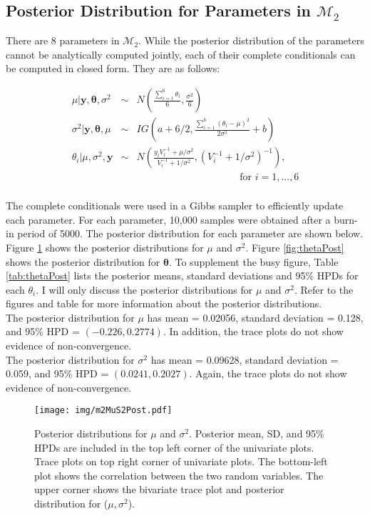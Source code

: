 \documentclass{../../tex_template/asaproc}
\newcommand{\p}[1]{\left(#1\right)}
\newcommand{\ds}{ \displaystyle }
\newcommand{\M}{\mathcal{M}}
\newcommand{\sumk}{\sum_{i=1}^6}
\begin{document}
\subsection{Posterior Distribution for Parameters in $\M_2$}
There are 8 parameters in $\M_2$. While the posterior distribution of the
parameters cannot be analytically computed jointly, each of their complete
conditionals can be computed in closed form. They are as follows:

\newcommand{\ivy}{\sumk V_i^{-1}}
$$
\begin{array}{rcl}
  \mu | \bm y,\bm\theta,\sigma^2  &\sim& 
  N\p{\ds\frac{\sumk \theta_i}{6},\ds\frac{\sigma^2}{6}}\\
  \sigma^2 | \bm y,\bm\theta , \mu &\sim& 
  IG\p{a+6/2,\ds\frac{\sumk(\theta_i-\mu)^2}{2\sigma^2}+b}\\
  \theta_i | \mu, \sigma^2, \bm y &\sim& 
  N\p{\ds\frac{y_iV_i^{-1}+\mu/\sigma^2}{V_i^{-1}+1/\sigma^2},\p{V_i^{-1}+1/\sigma^2}^{-1}},\\
  &&\hspace{10em} \text{~for~} i=1,...,6\\
\end{array}
$$

The complete conditionals were used in a Gibbs sampler to efficiently update
each parameter. For each parameter, 10,000 samples were obtained after a
burn-in period of 5000.  The posterior distribution for each parameter are
shown below. Figure \ref{fig:m2MuS2Post} shows the posterior distributions for
$\mu$ and $\sigma^2$. Figure \ref{fig:thetaPost} shows the posterior
distribution for $\bm\theta$. To supplement the busy figure, Table
\ref{tab:thetaPost} lists the posterior means, standard deviations and 95\%
HPDs for each $\theta_i$. I will only discuss the posterior distributions for
$\mu$ and $\sigma^2$. Refer to the figures and table for more information about
the posterior distributions.\\

The posterior distribution for $\mu$ has mean = 0.02056, standard deviation
= 0.128, and 95\% HPD = $(-0.226,0.2774)$. In addition, the trace plots
do not show evidence of non-convergence.\\

The posterior distribution for $\sigma^2$ has mean = 0.09628, standard deviation
= 0.059, and 95\% HPD = $(0.0241,0.2027)$. Again, the trace plots
do not show evidence of non-convergence.\\

\begin{figure}[H]
  \texttt{[image: img/m2MuS2Post.pdf]}
  \caption{Posterior distributions for $\mu$ and $\sigma^2$. Posterior
  mean, SD, and 95\% HPDs are included in the top left corner of the
  univariate plots. Trace plots on top right corner of univariate plots. The
  bottom-left plot shows the correlation between the two random variables. The
  upper corner shows the bivariate trace plot and posterior distribution
  for ($\mu,\sigma^2$).}
  \label{fig:m2MuS2Post}
\end{figure}
\end{document}
